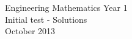 \documentclass[10pt]{article}
\begin{document}

{\centering
Engineering Mathematics Year 1\\
Initial test - Solutions\\
October 2013\\
\vspace{1in}
}

\showanswers
\begin{enumerate}
    \foreachproblem[questions]{
        \item
        \thisproblem
        \vspace{.5in}
    }
\end{enumerate}
\end{document}
